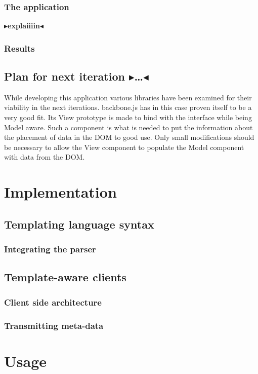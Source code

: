 \documentclass[twoside,11pt,openright]{report}
\newcommand{\todo}[1]{{\color[rgb]{.5,0,0}\textbf{$\blacktriangleright$#1$\blacktriangleleft$}}}
\begin{document}
\subsection{The application}
\todo{explaiiiin}
\subsection{Results}
\section{Plan for next iteration \todo{\dots}}
While developing this application various libraries have been examined for
their viability in the next iterations. backbone.js has in this case proven
itself to be a very good fit. Its View prototype is made to bind with the
interface while being Model aware. Such a component is what is needed to put the
information about the placement of data in the DOM to good use. Only small
modifications should be necessary to allow the View component to populate the
Model component with data from the DOM.


\chapter{Implementation}
\section{Templating language syntax}
\subsection{Integrating the parser}
\section{Template-aware clients}
\subsection{Client side architecture}
\subsection{Transmitting meta-data}


\chapter{Usage}
\end{document}
